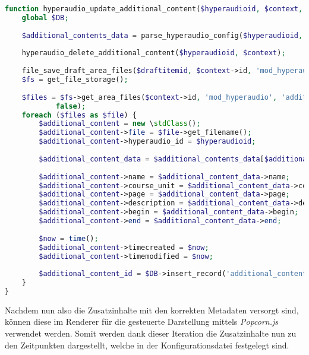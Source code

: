 \begin{lstlisting}[language=php,
             linewidth=\textwidth,
             caption={Ausschnitt der \textbf{locallib.php} in der 3. Iteration},
             label={lst:it3:locallib}]
function hyperaudio_update_additional_content($hyperaudioid, $context, $draftitemid, $configfile) {
    global $DB;
    
    $additional_contents_data = parse_hyperaudio_config($hyperaudioid, $context, $configfile);
    
    hyperaudio_delete_additional_content($hyperaudioid, $context);
    
    file_save_draft_area_files($draftitemid, $context->id, 'mod_hyperaudio', 'additional_content', $hyperaudioid);
    $fs = get_file_storage();
    
    $files = $fs->get_area_files($context->id, 'mod_hyperaudio', 'additional_content', $hyperaudioid, 'itemid, filepath, filename',
            false);
    foreach ($files as $file) {        
        $additional_content = new \stdClass();
        $additional_content->file = $file->get_filename();
        $additional_content->hyperaudio_id = $hyperaudioid;
        
        $additional_content_data = $additional_contents_data[$additional_content->file];
        
        $additional_content->name = $additional_content_data->name;
        $additional_content->course_unit = $additional_content_data->course_unit;
        $additional_content->page = $additional_content_data->page;
        $additional_content->description = $additional_content_data->description;
        $additional_content->begin = $additional_content_data->begin;
        $additional_content->end = $additional_content_data->end;
        
        $now = time();
        $additional_content->timecreated = $now;
        $additional_content->timemodified = $now;
        
        $additional_content_id = $DB->insert_record('additional_content', $additional_content);
    }
}
\end{lstlisting}

Nachdem nun also die Zusatzinhalte mit den korrekten Metadaten versorgt sind, können diese im Renderer für die gesteuerte Darstellung mittels \textit{Popcorn.js} verwendet werden. Somit werden dank dieser Iteration die Zusatzinhalte nun zu den Zeitpunkten dargestellt, welche in der Konfigurationsdatei festgelegt sind.

